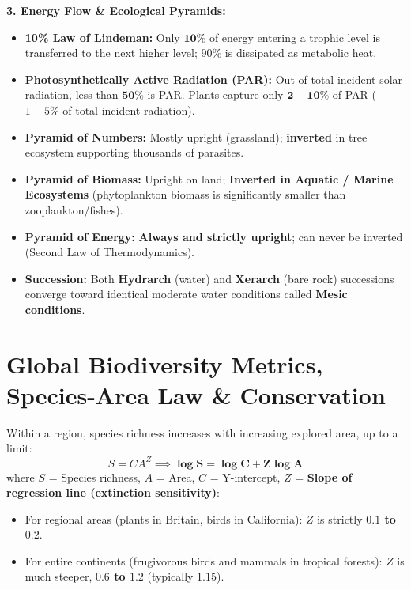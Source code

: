\documentclass[10pt,twoside,openright]{book}
\begin{document}
\begin{formulabox}
\textbf{3. Energy Flow \& Ecological Pyramids:}
\begin{itemize}
  \item \textbf{10\% Law of Lindeman:} Only $\mathbf{10\%}$ of energy entering a trophic level is transferred to the next higher level; $90\%$ is dissipated as metabolic heat.
  \item \textbf{Photosynthetically Active Radiation (PAR):} Out of total incident solar radiation, less than $\mathbf{50\%}$ is PAR. Plants capture only $\mathbf{2-10\%}$ of PAR ($1-5\%$ of total incident radiation).
  \item \textbf{Pyramid of Numbers:} Mostly upright (grassland); \textbf{inverted} in tree ecosystem supporting thousands of parasites.
  \item \textbf{Pyramid of Biomass:} Upright on land; \textbf{Inverted in Aquatic / Marine Ecosystems} (phytoplankton biomass is significantly smaller than zooplankton/fishes).
  \item \textbf{Pyramid of Energy:} \textbf{Always and strictly upright}; can never be inverted (Second Law of Thermodynamics).
  \item \textbf{Succession:} Both \textbf{Hydrarch} (water) and \textbf{Xerarch} (bare rock) successions converge toward identical moderate water conditions called \textbf{Mesic conditions}.
\end{itemize}
\end{formulabox}

\section{Global Biodiversity Metrics, Species-Area Law \& Conservation}

\begin{formulabox}
Within a region, species richness increases with increasing explored area, up to a limit:
\begin{equation}
  S = C A^Z \implies \mathbf{\log S = \log C + Z \log A}
\end{equation}
where $S$ = Species richness, $A$ = Area, $C$ = Y-intercept, $Z$ = \textbf{Slope of regression line (extinction sensitivity)}:
\begin{itemize}
  \item For regional areas (plants in Britain, birds in California): $Z$ is strictly \textbf{$0.1$ to $0.2$}.
  \item For entire continents (frugivorous birds and mammals in tropical forests): $Z$ is much steeper, \textbf{$0.6$ to $1.2$} (typically \textbf{$1.15$}).
\end{itemize}
\end{formulabox}
\end{document}
